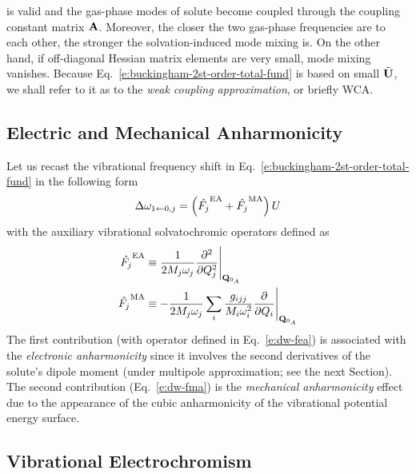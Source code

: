 \documentclass[b5paper,oneside,fleqn,11pt]{book}
\begin{document}
\begin{refsection}
is valid and the gas\hyp{}phase modes of solute become coupled
through the coupling constant matrix $\bf A$. Moreover, the closer
the two gas\hyp{}phase frequencies are to each other, the stronger the solvation\hyp{}induced
mode mixing is. On the other hand, if off\hyp{}diagonal Hessian matrix elements are
very small, mode mixing vanishes. Because Eq.~\eqref{e:buckingham-2st-order-total-fund}
is based on small $\tilde{\bf U}$, we shall refer to it
as to the \emph{weak coupling approximation}, or briefly WCA.

\subsection{Electric and Mechanical Anharmonicity\label{s:ea-mea}}

Let us recast the vibrational frequency shift in Eq.~\eqref{e:buckingham-2st-order-total-fund}
in the following form
%
\begin{equation} 
 \Delta\omega_{1\leftarrow 0,j} = \left( \hat{F_j}^{\rm EA} + \hat{F_j}^{\rm MA}\right) U
\end{equation}
%
with the auxiliary vibrational solvatochromic operators defined as
%
\begin{subequations} \label{e:dw-fea-fma}
 \begin{align}
  \hat{F_j}^{\rm EA} &\equiv  \frac{1}{2M_j\omega_j} \frac{\partial^2}{\partial Q_j^2} \Bigg|_{{\bf Q}_{0_A}} 
         \label{e:dw-fea}\\
  \hat{F_j}^{\rm MA} &\equiv -\frac{1}{2M_j\omega_j} 
             \sum_i \frac{g_{ijj}}{M_i\omega_i^2} \frac{\partial}{\partial Q_i} \Bigg|_{{\bf Q}_{0_A}} 
         \label{e:dw-fma}
 \end{align}
\end{subequations}
%
The first contribution (with operator defined in Eq.~\eqref{e:dw-fea}) 
is associated with the \emph{electronic anharmonicity}
since it involves the second derivatives of the solute's dipole
moment (under multipole approximation; see the next Section). 
The second contribution (Eq.~\eqref{e:dw-fma})
is the \emph{mechanical anharmonicity} effect due to the appearance of the 
cubic anharmonicity of the vibrational potential energy surface.

\subsection{Vibrational Electrochromism\label{s:vibr-electrochromism}}


\end{refsection}
\end{document}
